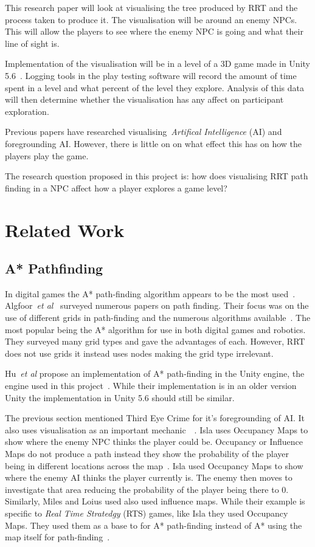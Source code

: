 \documentclass[journal]{IEEEtran}
\begin{document}
This research paper will look at visualising the tree produced by RRT and the process taken to produce it.  The visualisation will be around an enemy NPCs. This will allow the players to see where the enemy NPC is going and what their line of sight is. 

Implementation  of the visualisation will be in a level of a 3D game made in Unity 5.6~\cite{software:Unity}. Logging tools in the play testing software will record the amount of time spent in a level and what percent of the level they explore.   Analysis of this data will then determine whether the visualisation has any affect on participant exploration.

Previous papers have researched visualising~\textit{Artifical Intelligence} (AI) and foregrounding AI. However, there is little on on what effect this has on how the players play the game.

The research question proposed in this project is: how does visualising RRT path finding in a NPC affect how a player explores a game level?

\section{Related Work}

\subsection{A* Pathfinding}
In digital games the A* path-finding algorithm appears to be the most used~\cite{Algfoor2015}.  Algfoor~\textit{et al}~\cite{Algfoor2015} surveyed numerous papers on path finding. Their focus was on the use of different grids in path-finding and the numerous algorithms available~\cite{Algfoor2015}. The most popular being the A* algorithm for use in both digital games and robotics. They surveyed many grid types and gave the advantages of each. However, RRT does not use grids it instead uses nodes making the grid type irrelevant.

Hu~\textit{et al} propose an implementation of A* path-finding in the Unity engine, the engine used in this project~\cite{Hu2012}.  While their implementation is in an older version Unity the implementation in Unity 5.6 should still be similar. 

The previous section mentioned Third Eye Crime for it's foregrounding of AI.  It also uses visualisation as an important mechanic~\cite{Isla2014}~\cite{ game:ThirdEyeCrime}.  Isla uses Occupancy Maps to show where the enemy NPC thinks the player could be. Occupancy or Influence Maps do not produce a path instead they show the probability of the player being in different locations across the map~\cite{Isla2014, Miles2006}. Isla used Occupancy Maps to show where the enemy AI thinks the player currently is. The enemy then moves to investigate that area reducing the probability of the player being there to 0.  Similarly, Miles and Loius used also used influence maps. While their example is specific to \textit{Real Time Stratedgy} (RTS) games, like Isla they used Occupancy Maps.  They used them as a base to for A* path-finding instead of A* using the map itself for path-finding~\cite{Miles2006}.\\
\end{document}
